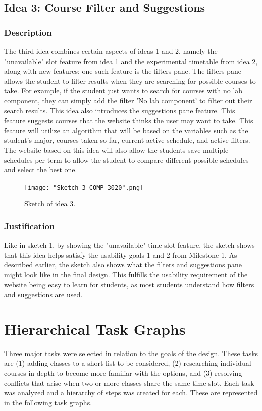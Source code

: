 \documentclass{article}
\begin{document}
\subsection{Idea 3: Course Filter and Suggestions}%
\subsubsection{Description}
The third idea combines certain aspects of ideas 1 and 2, namely the "unavailable" slot feature from idea 1 and the experimental timetable from idea 2, along with new features; one such feature is the filters pane. The filters pane allows the student to filter results when they are searching for possible courses to take. For example, if the student just wants to search for courses with no lab component, they can simply add the filter 'No lab component' to filter out their search results. This idea also introduces the suggestions pane feature. This feature suggests courses that the website thinks the user may want to take. This feature will utilize an algorithm that will be based on the variables such as the student's major, courses taken so far, current active schedule, and active filters. The website based on this idea will also allow the students save multiple schedules per term to allow the student to compare different possible schedules and select the best one.

\begin{figure}[!h]
\centering
\caption{Sketch of idea 3.}
\texttt{[image: "Sketch\_3\_COMP\_3020".png]}
\end{figure}

\subsubsection{Justification}
Like in sketch 1, by showing the "unavailable" time slot feature, the sketch shows that this idea helps satisfy the usability goals 1 and 2 from Milestone 1. As described earlier, the sketch also shows what the filters and suggestions pane might look like in the final design. This fulfills the usability requirement of the website being easy to learn for students, as most students understand how filters and suggestions are used.


\newpage
\section{Hierarchical Task Graphs}
Three major tasks were selected in relation to the goals of the design. These tasks are (1) adding classes to a short list to be considered, (2) researching individual courses in depth to become more familiar with the options, and (3) resolving conflicts that arise when two or more classes share the same time slot. Each task was analyzed and a hierarchy of steps was created for each. These are represented in the following task graphs.
\end{document}
